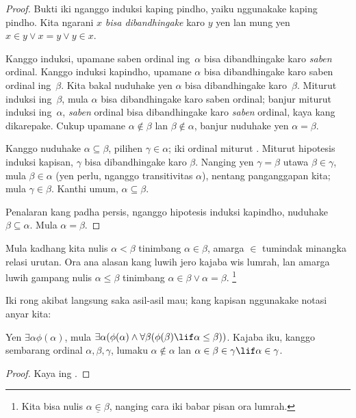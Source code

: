 \documentclass[../../../include/open-logic-section]{subfiles}
\begin{document}
\begin{proof}
Bukti iki nganggo induksi kaping pindho, yaiku
nggunakake  kaping pindho.
Kita ngarani $x$ \emph{bisa dibandhingake} karo
$y$ yen lan mung yen $x \in y \lor x = y \lor y \in x$.

Kanggo induksi, upamane saben ordinal ing~$\alpha$
bisa dibandhingake karo \emph{saben} ordinal. Kanggo
induksi kapindho, upamane $\alpha$ bisa dibandhingake
karo saben ordinal ing~$\beta$. Kita bakal nuduhake
yen $\alpha$ bisa dibandhingake karo~$\beta$.
Miturut induksi ing~$\beta$, mula $\alpha$ bisa
dibandhingake karo saben ordinal; banjur miturut
induksi ing~$\alpha$, \emph{saben} ordinal bisa
dibandhingake karo \emph{saben} ordinal, kaya kang
dikarepake. Cukup upamane $\alpha \notin \beta$
lan $\beta \notin \alpha$, banjur nuduhake yen
$\alpha = \beta$.

Kanggo nuduhake $\alpha \subseteq \beta$, pilihen
$\gamma \in \alpha$; iki ordinal miturut
. Miturut hipotesis induksi
kapisan, $\gamma$ bisa dibandhingake karo $\beta$.
Nanging yen $\gamma = \beta$ utawa
$\beta \in \gamma$, mula $\beta \in \alpha$
(yen perlu, nganggo transitivitas $\alpha$),
nentang panganggapan kita; mula $\gamma \in \beta$.
Kanthi umum, $\alpha \subseteq \beta$.

Penalaran kang padha persis, nganggo hipotesis
induksi kapindho, nuduhake $\beta \subseteq \alpha$.
Mula $\alpha = \beta$.
\end{proof}\noindent Mula kadhang kita nulis
$\alpha <\beta$ tinimbang $\alpha \in \beta$,
amarga $\in$ tumindak minangka relasi urutan.
Ora ana alasan kang luwih jero kajaba wis lumrah,
lan amarga luwih gampang nulis $\alpha \leq \beta$
tinimbang $\alpha \in \beta \lor \alpha = \beta$.
\footnote{Kita bisa nulis
$\alpha \mathrel{\underline{\in}} \beta$,
nanging cara iki babar pisan ora lumrah.}

Iki rong akibat langsung saka asil-asil mau;
kang kapisan nggunakake notasi anyar kita:

\begin{cor}
Yen $\exists \alpha\phi(\alpha)$, mula
$\exists \alpha(\phi(\alpha)
\land \forall \beta(\phi(\beta) \lif \alpha \leq \beta))$.
Kajaba iku, kanggo sembarang ordinal $\alpha, \beta, \gamma$,
lumaku $\alpha \notin \alpha$ lan
$\alpha \in \beta \in \gamma \lif \alpha \in \gamma$.
\end{cor}

\begin{proof}
Kaya ing .
\end{proof}
\end{document}
